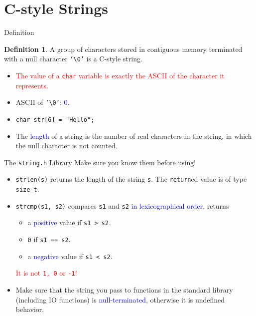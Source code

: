 \documentclass[handout]{beamer}
\newcommand{\red}[1]{\textcolor{red}{#1}}
\newcommand{\blue}[1]{\textcolor{blue}{#1}}
\newcommand{\ttt}[1]{\texttt{#1}}
\theoremstyle{definition}
\newtheorem{dfn}{Definition}
\begin{document}
\section{C-style Strings}

\begin{frame}{Definition}
    \begin{dfn}
        A group of characters stored in contiguous memory terminated with a null character \ttt{`\textbackslash 0'} is a C-style string.
    \end{dfn}
    \pause
    \begin{itemize}
        \item \red{The value of a \ttt{char} variable is exactly the ASCII of the character it represents.}
        \item ASCII of \ttt{`\textbackslash 0'}: \blue{0}.
        \item \ttt{char str[6] = "Hello";}
        \item The \blue{length} of a string is the number of real characters in the string, in which the null character is not counted.
    \end{itemize}
\end{frame}

\begin{frame}{The \ttt{string.h} Library}
    Make sure you know them before using!
    \begin{itemize}
        \item \ttt{strlen(s)} returns the length of the string \ttt{s}. The \ttt{return}ed value is of type \ttt{size\_t}.
        \pause
        \item \ttt{strcmp(s1, s2)} compares \ttt{s1} and \ttt{s2} \blue{in lexicographical order}, returns
        \begin{itemize}
            \item a \blue{positive} value if \ttt{s1 > s2}.
            \item \ttt{0} if \ttt{s1 == s2}.
            \item a \blue{negative} value if \ttt{s1 < s2}.
        \end{itemize}
        \red{It is not \ttt{1, 0} or \ttt{-1}!}
        \pause
        \item Make sure that the string you pass to functions in the standard library (including IO functions) is \blue{null-terminated}, otherwise it is undefined behavior.
    \end{itemize}
\end{frame}
\end{document}

